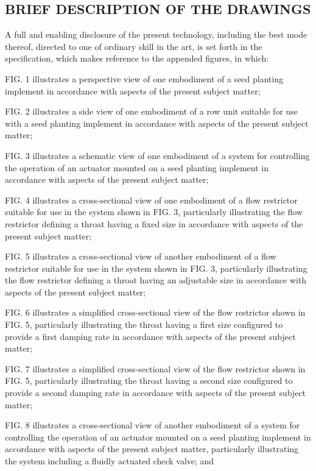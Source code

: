 \documentclass[11pt,a4paper]{article}
\begin{document}
\subsection{BRIEF DESCRIPTION OF THE DRAWINGS}

A full and enabling disclosure of the present technology, including the best mode thereof, directed to one of ordinary skill in the art, is set forth in the specification, which makes reference to the appended figures, in which:

FIG. 1 illustrates a perspective view of one embodiment of a seed planting implement in accordance with aspects of the present subject matter;

FIG. 2 illustrates a side view of one embodiment of a row unit suitable for use with a seed planting implement in accordance with aspects of the present subject matter;

FIG. 3 illustrates a schematic view of one embodiment of a system for controlling the operation of an actuator mounted on a seed planting implement in accordance with aspects of the present subject matter;

FIG. 4 illustrates a cross-sectional view of one embodiment of a flow restrictor suitable for use in the system shown in FIG. 3, particularly illustrating the flow restrictor defining a throat having a fixed size in accordance with aspects of the present subject matter;

FIG. 5 illustrates a cross-sectional view of another embodiment of a flow restrictor suitable for use in the system shown in FIG. 3, particularly illustrating the flow restrictor defining a throat having an adjustable size in accordance with aspects of the present subject matter;

FIG. 6 illustrates a simplified cross-sectional view of the flow restrictor shown in FIG. 5, particularly illustrating the throat having a first size configured to provide a first damping rate in accordance with aspects of the present subject matter;

FIG. 7 illustrates a simplified cross-sectional view of the flow restrictor shown in FIG. 5, particularly illustrating the throat having a second size configured to provide a second damping rate in accordance with aspects of the present subject matter;

FIG. 8 illustrates a cross-sectional view of another embodiment of a system for controlling the operation of an actuator mounted on a seed planting implement in accordance with aspects of the present subject matter, particularly illustrating the system including a fluidly actuated check valve; and
\end{document}
